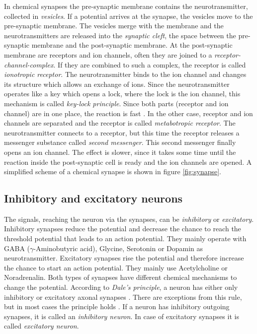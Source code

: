 In chemical synapses the pre-synaptic membrane contains the neurotransmitter, collected in \emph{vesicles}. If a potential arrives at the synapse, the vesicles move to the pre-synaptic membrane. The vesicles merge with the membrane and the neurotransmitters are released into the \emph{synaptic cleft}, the space between the pre-synaptic membrane and the post-synaptic membrane. At the post-synaptic membrane are receptors and ion channels, often they are joined to a \emph{receptor-channel-complex}. If they are combined to such a complex, the receptor is called \emph{ionotropic receptor}. The neurotransmitter binds to the ion channel and changes its structure which allows an exchange of ions. Since the neurotransmitter operates like a key which opens a lock, where the lock is the ion channel, this mechanism is called \emph{key-lock principle}. Since both parts (receptor and ion channel) are in one place, the reaction is fast \parencite[p. 40]{deetjen2005repetitorium}. In the other case, receptor and ion channels are separated and the receptor is called \emph{metabotropic receptor}. The neurotransmitter connects to a receptor, but this time the receptor releases a messenger substance called \emph{second messenger}. This second messenger finally opens an ion channel. The effect is slower, since it takes some time until the reaction inside the post-synaptic cell is ready and the ion channels are opened. A simplified scheme of a chemical synapse is shown in figure \ref{fig:synapse}.

\subsection{Inhibitory and excitatory neurons}
\label{sec:inhib-excit}

The signals, reaching the neuron via the synapses, can be \emph{inhibitory} or \emph{excitatory}. Inhibitory synapses reduce the potential and decrease the chance to reach the threshold potential that leads to an action potential. They mainly operate with GABA ($\gamma$-Aminobutyric acid), Glycine, Serotonin or Dopamin as neurotransmitter. Excitatory synapses rise the potential and therefore increase the chance to start an action potential. They mainly use Acetylcholine or Noradrenalin. Both types of synapses have different chemical mechanisms to change the potential. According to \emph{Dale's principle}, a neuron has either only inhibitory or excitatory axonal synapses \parencite{dale1935pharmacology, eccles1976electrical}. There are exceptions from this rule, but in most cases the principle holds \parencite{sossin1990dale}. If a neuron has inhibitory outgoing synapses, it is called an \emph{inhibitory neuron}. In case of excitatory synapses it is called \emph{excitatory neuron}.

